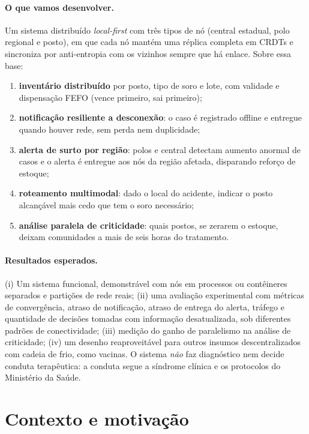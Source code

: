 \documentclass[a4paper,12pt]{article}
\begin{document}
\paragraph{O que vamos desenvolver.} Um sistema distribuído
\emph{local-first} com três tipos de nó (central estadual, polo regional e
posto), em que cada nó mantém uma réplica completa em CRDTs e sincroniza por
anti-entropia com os vizinhos sempre que há enlace. Sobre essa base:
\begin{enumerate}
  \item \textbf{inventário distribuído} por posto, tipo de soro e lote, com
        validade e dispensação FEFO (vence primeiro, sai primeiro);
  \item \textbf{notificação resiliente a desconexão}: o caso é registrado
        offline e entregue quando houver rede, sem perda nem duplicidade;
  \item \textbf{alerta de surto por região}: polos e central detectam aumento
        anormal de casos e o alerta é entregue aos nós da região afetada,
        disparando reforço de estoque;
  \item \textbf{roteamento multimodal}: dado o local do acidente, indicar o
        posto alcançável mais cedo que tem o soro necessário;
  \item \textbf{análise paralela de criticidade}: quais postos, se zerarem o
        estoque, deixam comunidades a mais de seis horas do tratamento.
\end{enumerate}

\paragraph{Resultados esperados.} (i) Um sistema funcional, demonstrável com
nós em processos ou contêineres separados e partições de rede reais;
(ii) uma avaliação experimental com métricas de convergência, atraso de
notificação, atraso de entrega do alerta, tráfego e quantidade de decisões
tomadas com informação desatualizada, sob diferentes padrões de
conectividade; (iii) medição do ganho de paralelismo na análise de
criticidade; (iv) um desenho reaproveitável para outros insumos
descentralizados com cadeia de frio, como vacinas. O sistema \emph{não} faz
diagnóstico nem decide conduta terapêutica: a conduta segue a síndrome
clínica e os protocolos do Ministério da Saúde.

\section{Contexto e motivação}
\label{sec:contexto}
\end{document}
